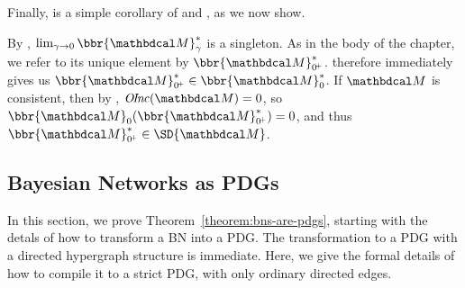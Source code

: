 \begin{subappendices}
Finally,  is a simple corollary of  and , as we now show. 
\begin{lproof}\label{proof:consist}
By , $\lim_{\gamma \to 0}\bbr{\dg M}_\gamma^*$
is a singleton. As in the body of the chapter, we refer to its unique element by $\bbr{\dg M}^*_{0^{\!+}}$.
 therefore immediately gives us $\bbr{\dg M}^*_{0^{\!+}} \in \bbr{\dg M}_0^*$.  
%
If $\dg M$ is consistent, then by ,
$\OInc({\dg M}) = 0$, so $\bbr{\dg M}_0(\bbr{\dg M}^*_{0^{\!+}}) = 0$, and thus
$\bbr{\dg M}^*_{0^{\!+}} 
\in \SD{\dg M}$. 
\end{lproof}


\subsection{Bayesian Networks as PDGs}
In this section, we prove Theorem~\ref{theorem:bns-are-pdgs},
%
% 
%
    starting with the detals of how to transform a BN into a PDG.
%
The transformation to a PDG with a directed hypergraph structure is immediate.
Here, we give the formal details of how to compile it to a strict PDG, with only ordinary directed edges. 


\end{subappendices}
